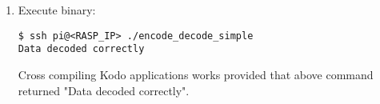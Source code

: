 \begin{enumerate}
\item Execute binary:
\begin{lstlisting}[]
$ ssh pi@<RASP_IP> ./encode_decode_simple
Data decoded correctly
\end{lstlisting}
\FloatBarrier
\vspace{-5mm}

Cross compiling Kodo applications works provided that above command
returned "Data decoded correctly".

%
%
%


\end{enumerate}

%






